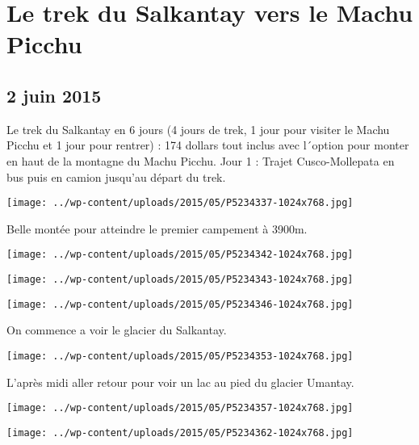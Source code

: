 \chapter{Le trek du Salkantay vers le Machu Picchu}
\section*{2 juin 2015}
Le trek du Salkantay en 6 jours (4 jours de trek, 1 jour pour visiter le Machu Picchu et 1 jour pour rentrer) : 174 dollars tout inclus avec l´option pour monter en haut de la montagne du Machu Picchu. \newline
 Jour 1 : \newline
 Trajet Cusco-Mollepata en bus puis en camion jusqu'au départ du trek. \newline
 \newline
\centerline{\texttt{[image: ../wp-content/uploads/2015/05/P5234337-1024x768.jpg]} } 
 \newline
 Belle montée pour atteindre le premier campement à 3900m. \newline
 \newline
\centerline{\texttt{[image: ../wp-content/uploads/2015/05/P5234342-1024x768.jpg]} } 
 \newline
 \newline
\centerline{\texttt{[image: ../wp-content/uploads/2015/05/P5234343-1024x768.jpg]} } 
 \newline
 \newline
\centerline{\texttt{[image: ../wp-content/uploads/2015/05/P5234346-1024x768.jpg]} } 
 \newline
 On commence a voir le glacier du Salkantay. \newline
 \newline
\centerline{\texttt{[image: ../wp-content/uploads/2015/05/P5234353-1024x768.jpg]} } 
 \newline
 L'après midi aller retour pour voir un lac au pied du glacier Umantay. \newline
 \newline
\centerline{\texttt{[image: ../wp-content/uploads/2015/05/P5234357-1024x768.jpg]} } 
 \newline
 \newline
\centerline{\texttt{[image: ../wp-content/uploads/2015/05/P5234362-1024x768.jpg]} } 
 \newline
 \newline
